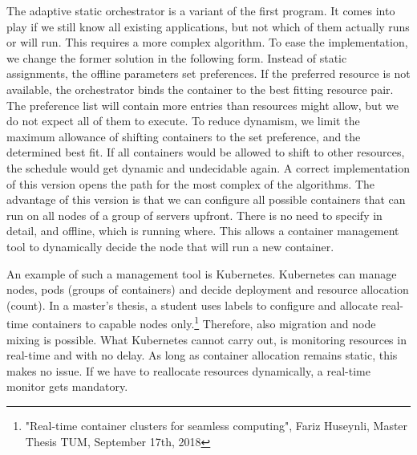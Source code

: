 \documentclass[]{scrartcl}
\begin{document}
The adaptive static orchestrator is a variant of the first program.
It comes into play if we still know all existing applications, but not which of them actually runs or will run. 
This requires a more complex algorithm.
To ease the implementation, we change the former solution in the following form.
Instead of static assignments, the offline parameters set preferences. 
If the preferred resource is not available, the orchestrator binds the container to the best fitting resource pair.
The preference list will contain more entries than resources might allow, but we do not expect all of them to execute.
To reduce dynamism, we limit the maximum allowance of shifting containers to the set preference, and the determined best fit.
If all containers would be allowed to shift to other resources, the schedule would get dynamic and undecidable again.
A correct implementation of this version opens the path for the most complex of the algorithms.
The advantage of this version is that we can configure all possible containers that can run on all nodes of a group of servers upfront.
There is no need to specify in detail, and offline, which is running where.
This allows a container management tool to dynamically decide the node that will run a new container.

An example of such a management tool is Kubernetes. 
Kubernetes can manage nodes, pods (groups of containers) and decide deployment and resource allocation (count).
In a master's thesis, a student uses labels to configure and allocate real-time containers to capable nodes only.\footnote{ "Real-time container clusters for seamless computing", Fariz Huseynli, Master Thesis TUM, September 17th, 2018}
Therefore, also migration and node mixing is possible.
What Kubernetes cannot carry out, is monitoring resources in real-time and with no delay.
As long as container allocation remains static, this makes no issue. 
If we have to reallocate resources dynamically, a real-time monitor gets mandatory.
\end{document}

